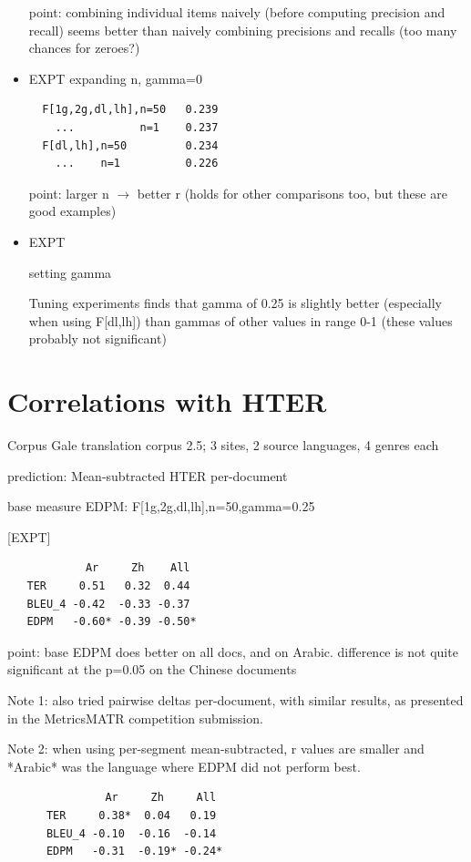 \documentclass{kluwer}    %
\begin{document}
\begin{article}
\begin{itemize}
  point: combining individual items naively (before computing
  precision and recall) seems better than naively combining precisions
  and recalls (too many chances for zeroes?)

\item EXPT
  expanding n, gamma=0

\begin{verbatim}
  F[1g,2g,dl,lh],n=50   0.239
    ...          n=1    0.237
  F[dl,lh],n=50         0.234
    ...    n=1          0.226
\end{verbatim}
  point: larger n $\to$ better r
  (holds for other comparisons too, but these are good examples)

\item  EXPT

  setting gamma

  Tuning experiments finds that gamma of 0.25 is slightly better
  (especially when using F[dl,lh]) than gammas of other values in
  range 0-1 (these values probably not significant)

\end{itemize}

\section{Correlations with HTER}
\label{sec:hter1}
  Corpus
    Gale translation corpus 2.5; 3 sites, 2 source languages, 4 genres each

  prediction:
    Mean-subtracted HTER per-document

  base measure EDPM: F[1g,2g,dl,lh],n=50,gamma=0.25

  [EXPT]
\begin{verbatim}
            Ar     Zh    All
   TER     0.51   0.32  0.44
   BLEU_4 -0.42  -0.33 -0.37
   EDPM   -0.60* -0.39 -0.50*
\end{verbatim}
  point: base EDPM does better on all docs, and on Arabic. difference
  is not quite significant at the p=0.05 on the Chinese documents

  Note 1: also tried pairwise deltas per-document, with similar
  results, as presented in the MetricsMATR competition submission.

  Note 2: when using per-segment mean-subtracted, r values are smaller
  and *Arabic* was the language where EDPM did not perform best.

\begin{verbatim}
               Ar     Zh     All
      TER     0.38*  0.04   0.19
      BLEU_4 -0.10  -0.16  -0.14
      EDPM   -0.31  -0.19* -0.24*
\end{verbatim}


\end{article}
\end{document}
